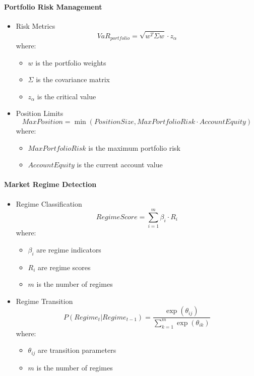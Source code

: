 \documentclass[conference]{IEEEtran}
\begin{document}
\paragraph{Portfolio Risk Management}
\begin{itemize}
    \item Risk Metrics
    \begin{equation}
    VaR_{portfolio} = \sqrt{w^T \Sigma w} \cdot z_\alpha
    \end{equation}
    where:
    \begin{itemize}
        \item $w$ is the portfolio weights
        \item $\Sigma$ is the covariance matrix
        \item $z_\alpha$ is the critical value
    \end{itemize}
    
    \item Position Limits
    \begin{equation}
    MaxPosition = \min(PositionSize, MaxPortfolioRisk \cdot AccountEquity)
    \end{equation}
    where:
    \begin{itemize}
        \item $MaxPortfolioRisk$ is the maximum portfolio risk
        \item $AccountEquity$ is the current account value
    \end{itemize}
\end{itemize}

\paragraph{Market Regime Detection}
\begin{itemize}
    \item Regime Classification
    \begin{equation}
    RegimeScore = \sum_{i=1}^m \beta_i \cdot R_i
    \end{equation}
    where:
    \begin{itemize}
        \item $\beta_i$ are regime indicators
        \item $R_i$ are regime scores
        \item $m$ is the number of regimes
    \end{itemize}
    
    \item Regime Transition
    \begin{equation}
    P(Regime_t | Regime_{t-1}) = \frac{\exp(\theta_{ij})}{\sum_{k=1}^m \exp(\theta_{ik})}
    \end{equation}
    where:
    \begin{itemize}
        \item $\theta_{ij}$ are transition parameters
        \item $m$ is the number of regimes
    \end{itemize}
\end{itemize}
\end{document}
